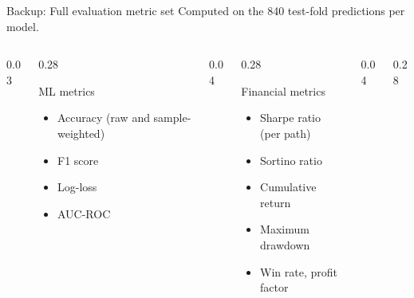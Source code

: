 \documentclass[aspectratio=169, t]{beamer}
\begin{document}
\begin{frame}{Backup: Full evaluation metric set}
\vspace{-0.5em}
\centering
{\footnotesize Computed on the 840 test-fold predictions per model.}
\vspace{0.6em}

\begin{columns}[T]
\begin{column}{0.03\textwidth}\hfill\end{column}
\begin{column}{0.28\textwidth}
{
\begin{block}{ML metrics}
\scriptsize
\begin{itemize}\setlength{\itemsep}{1pt}
  \item Accuracy (raw and sample-weighted)
  \item F1 score
  \item Log-loss
  \item AUC-ROC
\end{itemize}
\end{block}
}
\end{column}
\begin{column}{0.04\textwidth}\hfill\end{column}
\begin{column}{0.28\textwidth}
{
\begin{block}{Financial metrics}
\scriptsize
\begin{itemize}\setlength{\itemsep}{1pt}
  \item Sharpe ratio (per path)
  \item Sortino ratio
  \item Cumulative return
  \item Maximum drawdown
  \item Win rate, profit factor
\end{itemize}
\end{block}
}
\end{column}
\begin{column}{0.04\textwidth}\hfill\end{column}
\begin{column}{0.28\textwidth}

\end{column}
\end{columns}
\end{frame}
\end{document}
